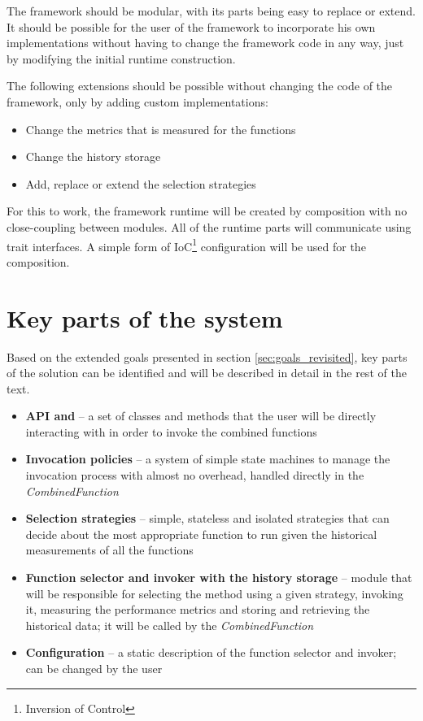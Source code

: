 The framework should be modular, with its parts being easy to replace or extend. It should be possible for the user of the framework to incorporate his own implementations without having to change the framework code in any way, just by modifying the initial runtime construction.

The following extensions should be possible without changing the code of the framework, only by adding custom implementations:

\begin{itemize}
	\item Change the metrics that is measured for the functions
	\item Change the history storage
	\item Add, replace or extend the selection strategies
\end{itemize}

For this to work, the framework runtime will be created by composition with no close-coupling between modules. All of the runtime parts will communicate using trait interfaces. A simple form of IoC\footnote{Inversion of Control} configuration will be used for the composition.

\section{Key parts of the system}

Based on the extended goals presented in section \ref{sec:goals_revisited}, key parts of the solution can be identified and will be described in detail in the rest of the text.

\begin{itemize}
	\item \textbf{API and } -- a set of classes and methods that the user will be directly interacting with in order to invoke the combined functions
	\item \textbf{Invocation policies} -- a system of simple state machines to manage the invocation process with almost no overhead, handled directly in the \textit{CombinedFunction}
	\item \textbf{Selection strategies} -- simple, stateless and isolated strategies that can decide about the most appropriate function to run given the historical measurements of all the functions
	\item \textbf{Function selector and invoker with the history storage} -- module that will be responsible for selecting the method using a given strategy, invoking it, measuring the performance metrics and storing and retrieving the historical data; it will be called by the \textit{CombinedFunction}
	\item \textbf{Configuration} -- a static description of the function selector and invoker; can be changed by the user
\end{itemize}